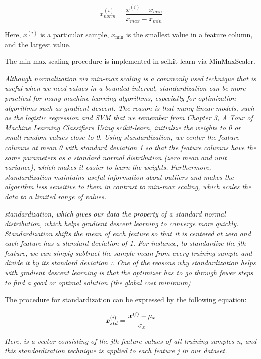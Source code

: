 \begin{equation} \label{eq:normalization}
    x_{norm}^{(i)} = \frac{x^{(i)} - x_{min}} {x_{max} - x_{min}}
\end{equation}

Here, $x^{(i)}$ is a particular sample, $x_{\min}$ is the smallest value in a feature column, and  the largest value.

The min-max scaling procedure is implemented in scikit-learn via MinMaxScaler.

\textit{Although normalization via min-max scaling is a commonly used technique that is useful when we need values in a bounded interval, standardization can be more practical for many machine learning algorithms, especially for optimization algorithms such as gradient descent. The reason is that many linear models, such as the logistic regression and SVM that we remember from Chapter 3, A Tour of Machine Learning Classifiers Using scikit-learn, initialize the weights to 0 or small random values close to 0. Using standardization, we center the feature columns at mean 0 with standard deviation 1 so that the feature columns have the same parameters as a standard normal distribution (zero mean and unit variance), which makes it easier to learn the weights. Furthermore, standardization maintains useful information about outliers and makes the algorithm less sensitive to them in contrast to min-max scaling, which scales the data to a limited range of values.}

\textit{standardization, which gives our data the property of a standard normal distribution, which helps gradient descent learning to converge more quickly. Standardization shifts the mean of each feature so that it is centered at zero and each feature has a standard deviation of 1. For instance, to standardize the jth feature, we can simply subtract the sample mean  from every training sample and divide it by its standard deviation :. One of the reasons why standardization helps with gradient descent learning is that the optimizer has to go through fewer steps to find a good or optimal solution (the global cost minimum)}

The procedure for standardization can be expressed by the following equation:

\begin{equation} \label{eq:standardization}
    \boldsymbol{x}^{(i)}_{std} = \frac{\boldsymbol{x}^{(i)} - \mu_x}{\sigma_x}
\end{equation}

\textit{Here,  is a vector consisting of the jth feature values of all training samples n, and this standardization technique is applied to each feature j in our dataset.}

